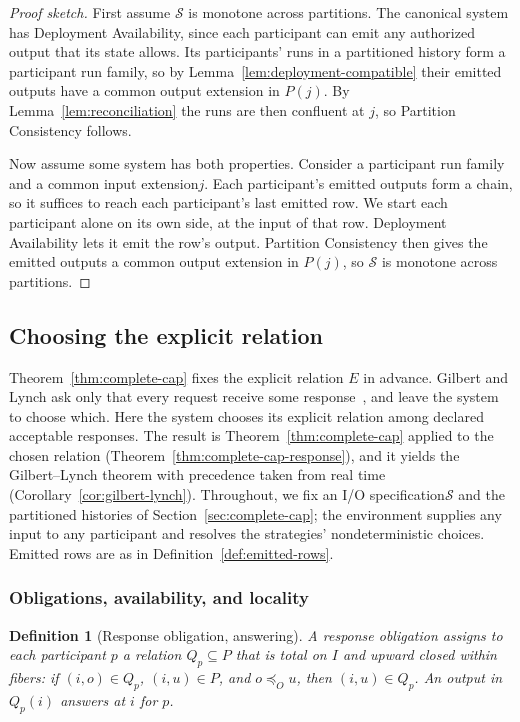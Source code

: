 \documentclass[sigconf]{cidr-2027}
\newtheorem{definition}{Definition}
\theoremstyle{remark}
\newcommand{\OutputOrd}{\preceq_O}
\newcommand{\indesc}{input extension\xspace} %
\newcommand{\outnoun}{output extension\xspace}%
\newcommand{\Spec}{\mathcal{S}}
\newcommand{\spectype}[1][]{I/O specification#1\xspace}
\newcommand{\fiber}[1]{P(#1)}
\begin{document}
\begin{proof}[Proof sketch]
First assume $\Spec$ is monotone across partitions. The canonical system has
Deployment Availability, since each participant can emit any authorized output
that its state allows. Its participants' runs in a partitioned history form a
participant run family, so by Lemma~\ref{lem:deployment-compatible} their
emitted outputs have a common \outnoun in $\fiber{j}$. By
Lemma~\ref{lem:reconciliation} the runs are then confluent at $j$, so
Partition Consistency follows.

Now assume some system has both properties. Consider a participant run
family and a common \indesc $j$. Each participant's emitted outputs form a
chain, so it suffices to reach each participant's last emitted row. We start
each participant alone on its own side, at the input of that row. Deployment
Availability lets it emit the row's output. Partition Consistency then gives
the emitted outputs a common \outnoun in $\fiber{j}$, so $\Spec$ is monotone
across partitions.
\end{proof}

\subsection{Choosing the explicit relation}
\label{app:cap-response}

Theorem~\ref{thm:complete-cap} fixes the explicit relation $E$ in advance. Gilbert and Lynch ask only that every request receive some
response~\cite{gilbert2002cap}, and leave the system to choose which. Here
the system chooses its explicit relation among declared acceptable responses. The result is Theorem~\ref{thm:complete-cap} applied to the chosen relation
(Theorem~\ref{thm:complete-cap-response}), and it yields the Gilbert--Lynch
theorem with precedence taken from real time (Corollary~\ref{cor:gilbert-lynch}). Throughout, we fix an \spectype $\Spec$ and the partitioned histories of
Section~\ref{sec:complete-cap}; the environment supplies any input to any
participant and resolves the strategies' nondeterministic choices. Emitted
rows are as in Definition~\ref{def:emitted-rows}.

\subsubsection{Obligations, availability, and locality}

\begin{definition}[Response obligation, answering]
\label{def:response-obligation}
A \emph{response obligation} assigns to each participant $p$ a relation
$Q_p\subseteq P$ that is total on $I$ and upward closed within fibers: if
$(i,o)\in Q_p$, $(i,u)\in P$, and $o\OutputOrd u$, then $(i,u)\in Q_p$. An
output in $Q_p(i)$ \emph{answers} at $i$ for $p$.
\end{definition}
\end{document}
